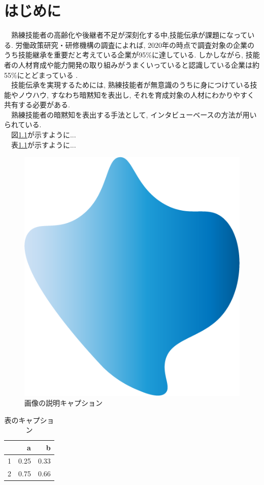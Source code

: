 \chapter{はじめに}
　熟練技能者の高齢化や後継者不足が深刻化する中,技能伝承が課題になっている. 労働政策研究・研修機構の調査によれば, 2020年の時点で調査対象の企業のうち技能継承を重要だと考えている企業が95\%に達している. しかしながら, 技能者の人材育成や能力開発の取り組みがうまくいっていると認識している企業は約55\%にとどまっている \cite{JILPT2020}. \\
　技能伝承を実現するためには, 熟練技能者が無意識のうちに身につけている技能やノウハウ, すなわち暗黙知を表出し, それを育成対象の人材にわかりやすく共有する必要がある.\\
　熟練技能者の暗黙知を表出する手法として, インタビューベースの方法が用いられている\cite{Onozato1998, Yashiro2021,Ogawa2011}. \\
　図\ref{fig1}が示すように...\\
　表\ref{table1}が示すように...\\



\begin{figure}[htbp]
  \centering
  \includegraphics[width=0.8\linewidth]{./image/icon.png}
  \caption{画像の説明キャプション}
  \label{fig1}
\end{figure}

\begin{table}[h]
  \centering
  \begin{tabular}{r|rr}
  & a & b\\ \hline
  1& 0.25 & 0.33\\
  2& 0.75 & 0.66\\
  \end{tabular}
  \caption{表のキャプション}
  \label{table1}
\end{table}